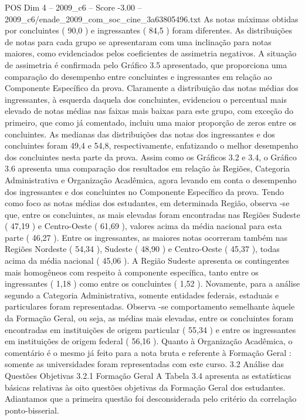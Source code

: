 \begin{textsample}{POS Dim 4 – 2009\_c6 – Score -3.00 – 2009\_c6/enade\_2009\_com\_soc\_cine\_3a63805496.txt}
As notas máximas obtidas por concluintes ( 90,0 ) e ingressantes ( 84,5 ) foram diferentes.
As distribuições de notas para cada grupo se apresentaram com uma inclinação para notas maiores, como evidenciados pelos coeficientes de assimetria negativos.
A situação de assimetria é confirmada pelo Gráfico 3.5 apresentado, que proporciona uma comparação do desempenho entre concluintes e ingressantes em relação ao Componente Específico da prova.
Claramente a distribuição das notas médias dos ingressantes, à esquerda daquela dos concluintes, evidenciou o percentual mais elevado de notas médias nas faixas mais baixas para este grupo, com exceção do primeiro, que como já comentado, incluiu uma maior proporção de zeros entre os concluintes.
As medianas das distribuições das notas dos ingressantes e dos concluintes foram 49,4 e 54,8, respectivamente, enfatizando o melhor desempenho dos concluintes nesta parte da prova.
Assim como os Gráficos 3.2 e 3.4, o Gráfico 3.6 apresenta uma comparação dos resultados em relação às Regiões, Categoria Administrativa e Organização Acadêmica, agora levando em conta o desempenho dos ingressantes e dos concluintes no Componente Específico da prova.
Tendo como foco as notas médias dos estudantes, em determinada Região, observa -se que, entre os concluintes, as mais elevadas foram encontradas nas Regiões Sudeste ( 47,19 ) e Centro-Oeste ( 61,69 ), valores acima da média nacional para esta parte ( 46,27 ).
Entre os ingressantes, as maiores notas ocorreram também nas Regiões Nordeste ( 54,34 ), Sudeste ( 48,90 ) e Centro-Oeste ( 45,37 ), todas acima da média nacional ( 45,06 ).
A Região Sudeste apresenta os contingentes mais homogêneos com respeito à componente específica, tanto entre os ingressantes ( 1,18 ) como entre os concluintes ( 1,52 ).
Novamente, para a análise segundo a Categoria Administrativa, somente entidades federais, estaduais e particulares foram representadas.
Observa -se comportamento semelhante àquele da Formação Geral, ou seja, as médias mais elevadas, entre os concluintes foram encontradas em instituições de origem particular ( 55,34 ) e entre os ingressantes em instituições de origem federal ( 56,16 ).
Quanto à Organização Acadêmica, o comentário é o mesmo já feito para a nota bruta e referente à Formação Geral : somente as universidades foram representadas com este curso. 3.2 Análise das Questões Objetivas 3.2.1 Formação Geral A Tabela 3.4 apresenta as estatísticas básicas relativas às oito questões objetivas da Formação Geral dos estudantes.
Adiantamos que a primeira questão foi desconsiderada pelo critério da correlação ponto-bisserial.

\end{textsample}
